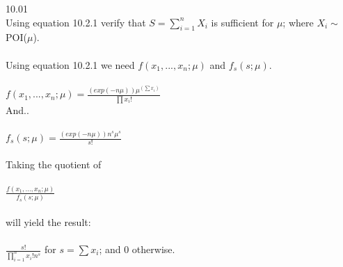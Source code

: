 

10.01\\
Using equation 10.2.1 verify that $S = \sum\limits_{i=1}^n X_i$ is sufficient for $\mu$; where $X_i\sim$ POI($\mu$).\\
\\
Using equation 10.2.1 we need $f(x_1,...,x_n;\mu)$ and $f_s(s;\mu)$.\\
\\
 $f(x_1,...,x_n;\mu) = \frac{(exp(-n\mu)) \mu^(\sum\nolimits  x_i)}{\prod\nolimits x_i!}$\\

And..\\
\\
$f_s(s;\mu) = \frac{(exp(-n\mu)) n^s\mu^s}{s!}$\\
\\
Taking the quotient of\\
\\
$\frac{f(x_1,...,x_n;\mu)}{f_s(s;\mu)}$\\
\\
will yield the result:\\
\\
$\frac{s!}{\prod\limits_{i=1}^n x_i ! n^s}$     for $s = \sum\nolimits x_i$; and $0$ otherwise.\\

